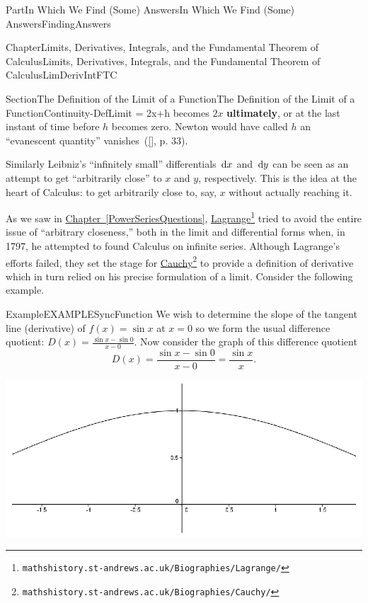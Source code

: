 \documentclass[oneside,10pt,]{book}
\newcommand{\xreffont}{\relax}
\newcommand{\terminology}[1]{\textbf{#1}}
\numberwithin{equation}{part}
\newcommand{\dx}[1]{\,{\rm d}#1}
\begin{document}
\begin{partptx}{Part}{In Which We Find (Some) Answers}{}{In Which We Find (Some) Answers}{}{}{FindingAnswers}
\begin{chapterptx}{Chapter}{Limits, Derivatives, Integrals, and the Fundamental Theorem of Calculus}{}{Limits, Derivatives, Integrals, and the Fundamental Theorem of Calculus}{}{}{LimDerivIntFTC}
\begin{sectionptx}{Section}{The Definition of the Limit of a Function}{}{The Definition of the Limit of a Function}{}{}{Continuity-DefLimit}
 = 2x+h\) becomes \(2x\) \terminology{ultimately}, or at the last instant of time before \(h\) becomes zero. Newton would have called \(h\) an ``evanescent quantity'' \textemdash{} vanishes~(\hyperlink{grabiner81__origin_cauch_rigor_calculy}{[{\xreffont 4}]}, p. 33).%
\par
Similarly Leibniz's ``infinitely small'' differentials \(\dx{
x}\) and \(\dx{ y}\) can be seen as an attempt to get ``arbitrarily close'' to \(x\) and \(y\), respectively. This is the idea at the heart of Calculus: to get arbitrarily close to, say, \(x\) without actually reaching it.%
\par
{} As we saw in \hyperref[PowerSeriesQuestions]{Chapter~{\xreffont\ref{PowerSeriesQuestions}}}, \href{https://mathshistory.st-andrews.ac.uk/Biographies/Lagrange/}{Lagrange}\footnote{\nolinkurl{mathshistory.st-andrews.ac.uk/Biographies/Lagrange/}\label{Continuity-DefLimit-5-5}} tried to avoid the entire issue of ``arbitrary closeness,'' both in the limit and differential forms when, in 1797, he attempted to found Calculus on infinite series. Although Lagrange's efforts failed, they set the stage for \href{https://mathshistory.st-andrews.ac.uk/Biographies/Cauchy/}{Cauchy}\footnote{\nolinkurl{mathshistory.st-andrews.ac.uk/Biographies/Cauchy/}\label{Continuity-DefLimit-5-9}} to provide a definition of derivative which in turn relied on his precise formulation of a limit.  Consider the following example.%
\begin{example}{Example}{}{EXAMPLESyncFunction}%
We wish to determine the slope of the tangent line (derivative) of \(f(x) = \sin x\) at \(x=0\) so we form the usual difference quotient: \(D(x)=\frac{\sin x -
\sin 0}{x-0}\). Now consider the graph of this difference quotient%
\begin{equation*}
D(x) =\frac{\sin x - \sin 0}{x-0}=\frac{\sin x
}{x}\text{.}
\end{equation*}
%
\begin{image}{0.22}{0.56}{0.22}{}%
\includegraphics[width=\linewidth]{external/images/SinGraph.png}

\end{image}
\end{example}
\end{sectionptx}
\end{chapterptx}
\end{partptx}
\end{document}
